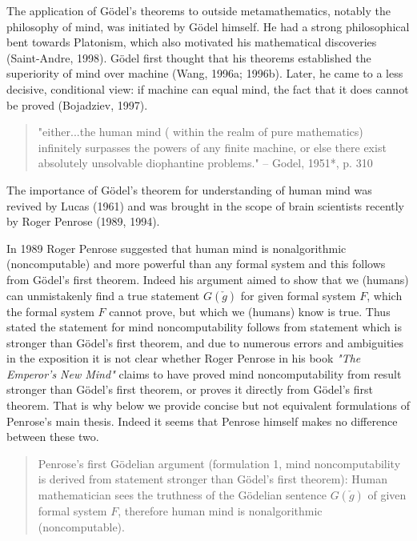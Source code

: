 \documentclass[12pt]{article}
\begin{document}
The application of G\"odel's theorems to  outside metamathematics,
notably the philosophy of mind, was initiated by G\"odel himself. He
had a strong philosophical bent towards Platonism, which also
motivated his mathematical discoveries (Saint-Andre, 1998). G\"odel first thought that his
theorems established the superiority of mind over machine (Wang, 1996a; 1996b). Later,
he came to a less decisive, conditional view: if machine can equal
mind, the fact that it does cannot be proved (Bojadziev, 1997).

\begin{verse} "either...the human mind ( within the realm of pure mathematics) infinitely surpasses the powers of any finite machine, or else there exist absolutely unsolvable diophantine problems." -- Godel, 1951*, p. 310
\end{verse}

The importance of G\"odel's theorem for understanding of human mind was
revived by Lucas (1961) and was brought in the scope of brain scientists
recently by Roger Penrose (1989, 1994).

In 1989 Roger Penrose suggested that human mind is nonalgorithmic (noncomputable) and more powerful than any formal system and this follows from G\"odel's first theorem. Indeed his argument aimed to show that we (humans) can unmistakenly find a true statement $G(\check{g})$ for given formal system $F$, which the formal system $F$ cannot prove, but which we (humans) know is true. Thus stated the statement for mind noncomputability follows from statement which is stronger than G\"odel's first theorem, and due to numerous errors and ambiguities in the exposition it is not clear whether Roger Penrose in his book \emph{"The Emperor's New Mind"} claims to have proved mind noncomputability from result stronger than G\"odel's first theorem, or proves it directly from G\"odel's first theorem. That is why below we provide concise but not equivalent formulations of Penrose's main thesis. Indeed it seems that Penrose himself makes no difference between these two.

\begin{verse}Penrose's first G\"odelian argument (formulation 1, mind noncomputability is derived from statement stronger than G\"odel's first theorem): Human mathematician sees the truthness of the G\"odelian sentence $G(\check{g})$ of given formal system $F$, therefore human mind is nonalgorithmic (noncomputable).
\end{verse}
\end{document}
